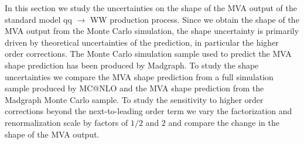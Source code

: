 In this section we study the uncertainties on the shape of the MVA output of the 
standard model qq $\rightarrow$ WW production process. Since we obtain the shape 
of the MVA output from the Monte Carlo simulation, the shape uncertainty is 
primarily driven by theoretical uncertainties of the prediction, in particular
the higher order corrections. The Monte Carlo simulation sample used to predict
the MVA shape prediction has been produced by Madgraph. To study the shape uncertainties
we compare the MVA shape prediction from a full simulation sample produced by MC@NLO
and the MVA shape prediction from the Madgraph Monte Carlo sample. To study the 
sensitivity to higher order corrections beyond the next-to-leading order term
we vary the factorization and renormalization scale by factors of $1/2$ and $2$ and
compare the change in the shape of the MVA output.

